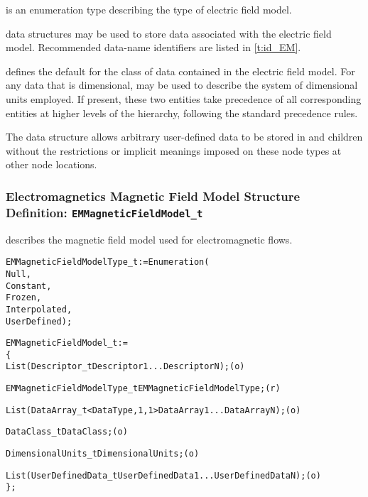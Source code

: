  is an enumeration type describing
the type of electric field model.

 data structures may be used to store data associated
with the electric field model.
Recommended data-name identifiers are listed in \autoref{t:id_EM}.

 defines the default for the class of data contained in
the electric field model.
For any data that is dimensional,  may be used to
describe the system of dimensional units employed.
If present, these two entities take precedence of all corresponding
entities at higher levels of the hierarchy, following the standard
precedence rules.

The  data structure allows arbitrary
user-defined data to be stored in  and
 children without the restrictions or implicit
meanings imposed on these node types at other node locations.

\subsubsection{Electromagnetics Magnetic Field Model Structure Definition: \texttt{EMMagneticFieldModel\_t}}

 describes the magnetic field model used
for electromagnetic flows.
\begin{alltt}
  EMMagneticFieldModelType\_t := Enumeration(
    Null,
    Constant,
    Frozen,
    Interpolated,
    UserDefined ) ;
\end{alltt}

\begin{alltt}
  EMMagneticFieldModel\_t :=
    \{
    List( Descriptor\_t Descriptor1 ... DescriptorN ) ;                      (o)

    EMMagneticFieldModelType\_t EMMagneticFieldModelType ;                   (r)
    
    List( DataArray\_t<DataType, 1, 1> DataArray1 ... DataArrayN ) ;         (o)

    DataClass\_t DataClass ;                                                 (o)
                
    DimensionalUnits\_t DimensionalUnits ;                                   (o)

    List( UserDefinedData\_t UserDefinedData1 ... UserDefinedDataN ) ;       (o)
    \} ;
\end{alltt}

